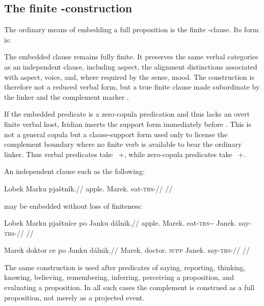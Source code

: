 \subsection{The finite -construction}

The ordinary means of embedding a full proposition is the finite
-clause. Its form is:

\begin{center}
\end{center}

The embedded clause remains fully finite. It preserves the same verbal
categories as an independent clause, including aspect, the alignment
distinctions associated with aspect, voice, and, where required by the sense,
mood. The construction is therefore not a reduced verbal form, but a true
finite clause made subordinate by the linker  and the complement
marker .

If the embedded predicate is a zero-copula predication and thus lacks an overt
finite verbal host, Iridian inserts the support form  immediately
before . This  is not a general copula but a clause-support
form used only to license the complement boundary where no finite verb is
available to bear the ordinary linker. Thus verbal predicates take
~+, while zero-copula predicates take ~+.

An independent clause such as the following:

\ex
\begingl
\gla Lobek Marku pjaštník.//
\glb apple.\Dir{} Marek.\Trs{} eat-\textsc{trs}-\Pf{}//
\glft {}//
\endgl
\xe

may be embedded without loss of finiteness:

\ex
\begingl
\gla Lobek Marku pjaštníce po Janku dálnik.//
\glb apple.\Dir{} Marek.\Trs{} eat-\textsc{trs}-\Pf{}-\Lnk{} \Compl{} Janek.\Trs{} say-\textsc{trs}-\Pf{}//
\glft {}//
\endgl
\xe

\ex
\begingl
\gla Marek doktor ce po Janku dálnik.//
\glb Marek.\Dir{} doctor.\Dir{} \textsc{supp} \Compl{} Janek.\Trs{} say-\textsc{trs}-\Pf{}//
\glft {}//
\endgl
\xe

The same construction is used after predicates of saying, reporting,
thinking, knowing, believing, remembering, inferring, perceiving a
proposition, and evaluating a proposition. In all such cases the complement
is construed as a full proposition, not merely as a projected event.

